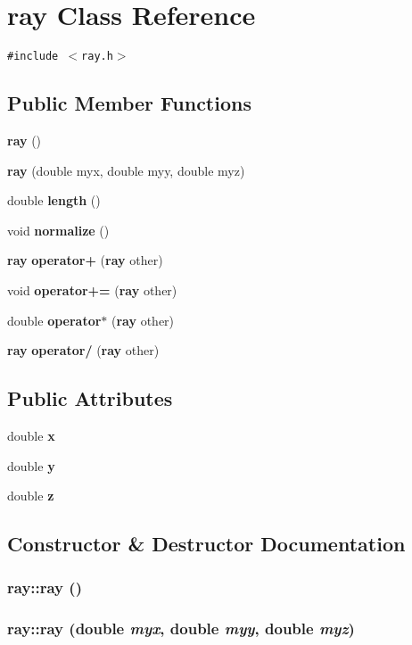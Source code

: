 \section{ray Class Reference}
\label{classray}
{\tt \#include $<$ray.h$>$}

\subsection*{Public Member Functions}
\begin{CompactItemize}
\item 
{\bf ray} ()
\item 
{\bf ray} (double myx, double myy, double myz)
\item 
double {\bf length} ()
\item 
void {\bf normalize} ()
\item 
{\bf ray} {\bf operator+} ({\bf ray} other)
\item 
void {\bf operator+=} ({\bf ray} other)
\item 
double {\bf operator$\ast$} ({\bf ray} other)
\item 
{\bf ray} {\bf operator/} ({\bf ray} other)
\end{CompactItemize}
\subsection*{Public Attributes}
\begin{CompactItemize}
\item 
double {\bf x}
\item 
double {\bf y}
\item 
double {\bf z}
\end{CompactItemize}


\subsection{Constructor \& Destructor Documentation}
\subsubsection[{ray}]{\setlength{\rightskip}{0pt plus 5cm}ray::ray ()}\label{classray_6a81906c090ceff40ac9a288639f4861}


\subsubsection[{ray}]{\setlength{\rightskip}{0pt plus 5cm}ray::ray (double {\em myx}, \/  double {\em myy}, \/  double {\em myz})}\label{classray_5a60830c7f35162a682edf393f24626b}




